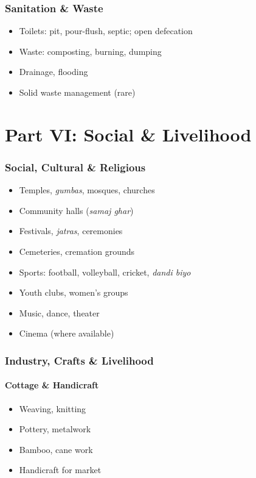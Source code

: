 \documentclass[11pt,a4paper]{article}
\begin{document}
\section{Sanitation \& Waste}
\begin{itemize}
    \item Toilets: pit, pour-flush, septic; open defecation
    \item Waste: composting, burning, dumping
    \item Drainage, flooding
    \item Solid waste management (rare)
\end{itemize}

\part{Part VI: Social \& Livelihood}

\section{Social, Cultural \& Religious}

\begin{itemize}
    \item Temples, \textit{gumbas}, mosques, churches
    \item Community halls (\textit{samaj ghar})
    \item Festivals, \textit{jatras}, ceremonies
    \item Cemeteries, cremation grounds
    \item Sports: football, volleyball, cricket, \textit{dandi biyo}
    \item Youth clubs, women's groups
    \item Music, dance, theater
    \item Cinema (where available)
\end{itemize}

\section{Industry, Crafts \& Livelihood}

\subsection{Cottage \& Handicraft}
\begin{itemize}
    \item Weaving, knitting
    \item Pottery, metalwork
    \item Bamboo, cane work
    \item Handicraft for market
\end{itemize}
\end{document}
